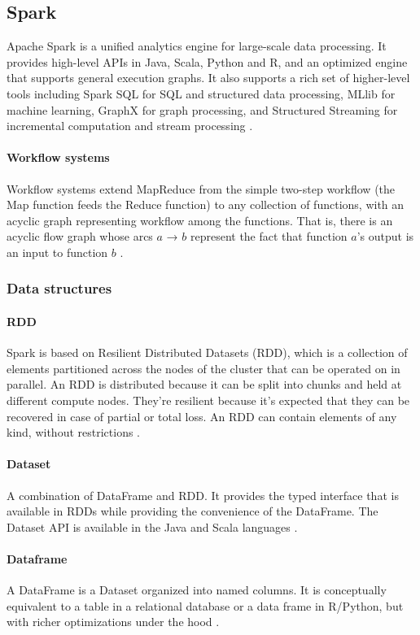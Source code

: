 \documentclass[\main/main.tex]{subfiles}
\begin{document}
\subsection{Spark}
Apache Spark is a unified analytics engine for large-scale data processing. It provides high-level APIs in Java, Scala, Python and R, and an optimized engine that supports general execution graphs. It also supports a rich set of higher-level tools including Spark SQL for SQL and structured data processing, MLlib for machine learning, GraphX for graph processing, and Structured Streaming for incremental computation and stream processing \cite{spark}.
\paragraph{Workflow systems} Workflow systems extend MapReduce from the simple two-step workflow (the Map function feeds the Reduce function) to any collection of functions, with an acyclic graph representing workflow among the functions. That is, there is an acyclic flow graph whose arcs $a$ → $b$ represent the fact that function $a$’s output is an input to function $b$ \cite{leskovec_rajaraman_ullman_2020}.
\subsubsection{Data structures}
\paragraph{RDD} Spark is based on Resilient Distributed Datasets (RDD), which is a collection of elements partitioned across the nodes of the cluster that can be operated on in parallel. An RDD is distributed because it can be split into chunks and held at different compute nodes. They're resilient because it's expected that they can be recovered in case of partial or total loss. An RDD can contain elements of any kind, without restrictions \cite{rdd}.
\paragraph{Dataset} A combination of DataFrame and RDD. It provides the typed interface that is available in RDDs while providing the convenience of the DataFrame. The Dataset API is available in the Java and Scala languages \cite{dataset}.
\paragraph{Dataframe} A DataFrame is a Dataset organized into named columns. It is conceptually equivalent to a table in a relational database or a data frame in R/Python, but with richer optimizations under the hood \cite{dataframe}.
\end{document}
